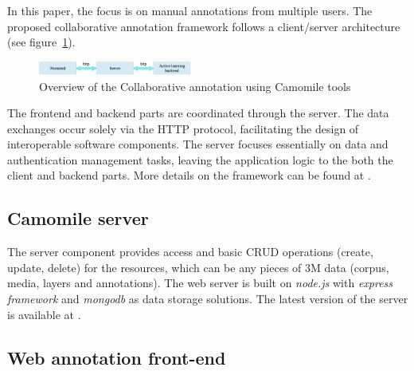 \documentclass[a4paper]{article}
\begin{document}
In this paper, the focus is on manual annotations from multiple users. The proposed collaborative annotation framework follows a client/server architecture (see figure~\ref{fig:overview}). 

\begin{figure}[h]
 	\includegraphics[width=0.45\textwidth]{overview.png}
	\caption{Overview of the Collaborative annotation using Camomile tools}
	\label{fig:overview}
\end{figure}

The frontend and backend parts are coordinated through the server. The data exchanges occur solely via the HTTP protocol, facilitating the design of interoperable software components. The server focuses essentially on data and authentication management tasks, leaving the application logic to the both the client and backend parts. More details on the framework can be found at \cite{urlframework}.


      \subsection{Camomile server}

The server component provides access and basic CRUD operations (create, update, delete) for the resources, which can be any pieces of 3M data (corpus, media, layers and annotations). The web server is built on \textit{node.js} with \textit{express framework} and \textit{mongodb} as data storage solutions. The latest version of the server is available at \cite{urlgithub}. 

        \vspace{-0.3cm}
      \subsection{Web annotation front-end}
        \vspace{-0.5cm}
\end{document}
